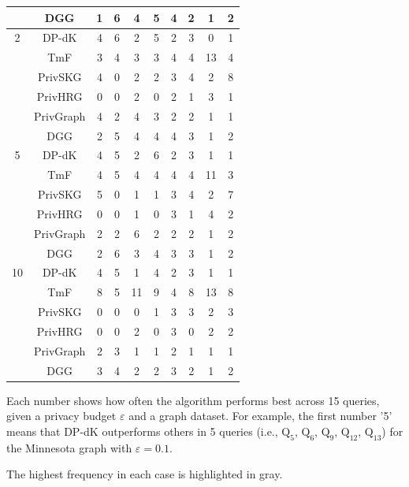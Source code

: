 \documentclass[conference]{IEEEtran}
\theoremstyle{plain}
\begin{document}
\begin{table}[t]
{\begin{threeparttable}
{\begin{tabular}{|c|c|c|c|c|c|c|c|c|c|}
    & DGG       & 1 & \cellcolor{gray!50}6 & \cellcolor{gray!50}4 &\cellcolor{gray!50} 5& \cellcolor{gray!50}4 &2 & 1 & 2\\  \hline
    2 & DP-dK    & \cellcolor{gray!50}4 &\cellcolor{gray!50} 6 & 2 & \cellcolor{gray!50}5& 2 & 3& 0 &1 \\
    & TmF       & 3 & 4 & 3 &3 & \cellcolor{gray!50}4 & \cellcolor{gray!50}4& \cellcolor{gray!50}13 & 4\\
    & PrivSKG   & \cellcolor{gray!50}4 & 0 & 2 & 2& 3 & \cellcolor{gray!50}4& 2 &\cellcolor{gray!50} 8\\
    & PrivHRG   & 0 & 0 & 2 & 0& 2 & 1& 3 &1 \\
    & PrivGraph & \cellcolor{gray!50}4 & 2 & \cellcolor{gray!50}4 &3 & 2 &2 & 1 & 1\\
    & DGG       & 2 & 5 & \cellcolor{gray!50}4 &4 & \cellcolor{gray!50}4 & 3& 1 & 2\\  \hline
    5 & DP-dK   & 4 & 5 & 2 &\cellcolor{gray!50}6 & 2 &3 & 1 & 1\\
    & TmF       & 4 & 5 & 4 & 4& \cellcolor{gray!50} 4& \cellcolor{gray!50}4& \cellcolor{gray!50}11 & 3\\
    & PrivSKG   & \cellcolor{gray!50}5 & 0 & 1 & 1& 3 & \cellcolor{gray!50}4& 2 & \cellcolor{gray!50}7\\
    & PrivHRG   & 0 & 0 & 1 &0 & 3 &1 & 4 &2 \\
    & PrivGraph & 2 & 2 & \cellcolor{gray!50}6 & 2& 2 &2 & 1 &2 \\
    & DGG       & 2 &\cellcolor{gray!50} 6 & 3 & 4& 3 & 3& 1 & 2\\  \hline
    10 & DP-dK  & 4 & \cellcolor{gray!50}5 & 1 & 4& 2 &3 & 1 & 1\\
    & TmF       & \cellcolor{gray!50}8 & \cellcolor{gray!50}5 & \cellcolor{gray!50}11 &\cellcolor{gray!50}9 & \cellcolor{gray!50}4 &\cellcolor{gray!50}8 & \cellcolor{gray!50}13 & \cellcolor{gray!50}8\\
    & PrivSKG   & 0 & 0 & 0 & 1& 3 & 3& 2 & 3\\
    & PrivHRG   & 0 & 0 & 2 &0 & 3 & 0& 2 & 2\\
    & PrivGraph & 2 & 3 & 1 & 1& 2 & 1& 1 & 1\\
    & DGG       & 3 & 4 & 2 & 2& 3 & 2& 1 & 2\\  \hline
   \end{tabular}
   }
    \begin{tablenotes}
    \item[1] Each number shows how often the algorithm performs best across 15 queries, given a privacy budget $\varepsilon$ and a graph dataset. 
    For example, the first number '5' means that DP-dK outperforms others in 5 queries (i.e., ${\text{Q}_5}$, ${\text{Q}_6}$, ${\text{Q}_9}$, ${\text{Q}_{12}}$, ${\text{Q}_{13}}$) for the Minnesota graph with $\varepsilon = 0.1$.
    \item[2] The highest frequency in each case is highlighted in gray.
   \end{tablenotes}
   \end{threeparttable}
   }
\end{table}
\end{document}
